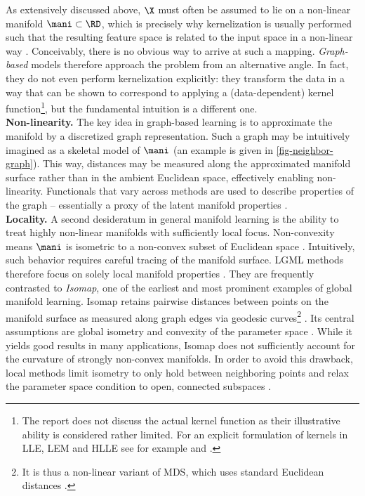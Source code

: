 As extensively discussed above, $\X$ must often be 
assumed to lie on a non-linear manifold $\mani \subset \RD$, which is precisely 
why kernelization is usually performed such that the resulting feature space is 
related to the input space in a non-linear way \citep{schoelkopfetal1998}.
Conceivably, there is no obvious way to arrive at such a mapping.
\textit{Graph-based} models therefore approach the problem from an alternative 
angle.
In fact, they do not even perform kernelization explicitly: they transform the 
data in a way that can be shown to correspond to applying a (data-dependent) 
kernel function\footnote{
The report does not discuss the actual kernel function as their illustrative 
ability is considered rather limited.
For an explicit formulation of kernels in LLE, LEM and HLLE see for example \citet{bengioetal2004} and \citet{weinbergeretal2004}.
}, 
but the fundamental intuition is a different one. 
\\

\textbf{Non-linearity.} 
The key idea in graph-based learning is to approximate the manifold by a 
discretized graph representation.
Such a graph may be intuitively imagined as a skeletal model of $\mani$ (an 
example is given in \ref{fig-neighbor-graph}).
This way, distances may be measured along the approximated manifold 
surface rather than in the ambient Euclidean space, effectively enabling 
non-linearity.
Functionals that vary across methods are used to describe properties of the 
graph -- essentially a proxy of the latent manifold properties 
\citep{sauletal2006}.
\\

\textbf{Locality.} A second desideratum in general manifold learning is the 
ability to treat highly non-linear manifolds with sufficiently local focus.
Non-convexity means $\mani$ is isometric to a non-convex subset of Euclidean 
space \citep{donohogrimes2003}. 
Intuitively, such behavior requires careful tracing of the manifold surface.
LGML methods therefore focus on solely local manifold properties 
\citep{cayton2005}.
They are frequently contrasted to \textit{Isomap}, one of the 
earliest and most prominent examples of global manifold learning.
Isomap retains pairwise distances between points on the manifold surface as 
measured along graph edges via geodesic curves\footnote{
It is thus a non-linear variant of MDS, which uses standard Euclidean distances 
\citep{tenenbaumdesilvalangford2000}.
} \citep{tenenbaumdesilvalangford2000}.
Its central assumptions are global isometry and convexity of the parameter 
space \citep{tenenbaumdesilvalangford2000}.
While it yields good results in many applications, Isomap does not sufficiently 
account for the curvature of strongly non-convex manifolds.
In order to avoid this drawback, local methods limit isometry to only hold 
between neighboring points and relax the parameter space 
condition to open, connected subspaces \citep{donohogrimes2003}.
\\

